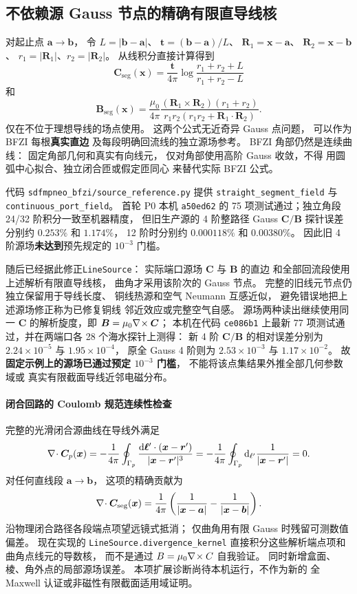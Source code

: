 \subsection{不依赖源 Gauss 节点的精确有限直导线核}
对起止点 $\bm a\to\bm b$，
令 $L=|\bm b-\bm a|$、
$\bm t=(\bm b-\bm a)/L$、
$\bm R_1=\bm x-\bm a$、
$\bm R_2=\bm x-\bm b$、
$r_1=|\bm R_1|$、$r_2=|\bm R_2|$。
从线积分直接计算得到
\[
\boxed{
\bm C_{\mathrm{seg}}(\bm x)
=\frac{\bm t}{4\pi}
\log\frac{r_1+r_2+L}{r_1+r_2-L}
}
\]
和
\[
\boxed{
\bm B_{\mathrm{seg}}(\bm x)
=\frac{\mu_0}{4\pi}
\frac{(\bm R_1\times\bm R_2)(r_1+r_2)}
{r_1r_2(r_1r_2+\bm R_1\cdot\bm R_2)} .
}
\]
仅在不位于理想导线的场点使用。
这两个公式无近奇异 Gauss 点问题，
可以作为 BFZI 每根\textbf{真实直边}
及每段明确回流线的独立源场参考。
BFZI 角部仍然是连续曲线：
固定角部几何和真实有向线元，
仅对角部使用高阶 Gauss 收敛，不得
用圆弧中心拟合、独立闭合匝或假定匝同心
来替代实际 BFZI 公式。

代码 \texttt{sdfmpneo\_bfzi/source\_reference.py}
提供 \texttt{straight\_segment\_field} 与
\texttt{continuous\_port\_field}。
首轮 P0 本机 \texttt{a50ed62} 的
75 项测试通过；独立角段 24/32 阶积分一致至机器精度，
但旧生产源的 4 阶整路径 Gauss
$\bm C/\bm B$ 探针误差分别约
$0.253\%$ 和 $1.174\%$，
12 阶时分别约 $0.000118\%$ 和 $0.00380\%$。
因此旧 4 阶源场\textbf{未达到}预先规定的
$10^{-3}$ 门槛。

随后已经据此修正\texttt{LineSource}：
实际端口源场 $\bm C$ 与 $\bm B$ 的直边
和全部回流段使用上述解析有限直导线核，
曲角才采用该阶次的 Gauss 节点。
完整的旧线元节点仍独立保留用于导线长度、
铜线热源和空气 Neumann 互感近似，
避免错误地把上述源场修正称为已修复铜线
邻近效应或完整空气自感。
源场两种读出继续使用同一
$\bm C$ 的解析旋度，即
$\bm B=\mu_0\nabla\!\times\bm C$；
本机在代码 \texttt{ce086b1} 上最新
77 项测试通过，并在两端口各 28 个海水探针上测得：
新 4 阶 $\bm C/\bm B$ 的相对误差分别为
$2.24\times10^{-5}$ 与 $1.95\times10^{-4}$，
原全 Gauss 4 阶则为
$2.53\times10^{-3}$ 与 $1.17\times10^{-2}$。
故\textbf{固定示例上的源场已通过预定 $10^{-3}$ 门槛}，
不能将该点集结果外推全部几何参数域或
真实有限截面导线近邻电磁分布。

\paragraph{闭合回路的 Coulomb 规范连续性检查}
完整的光滑闭合源曲线在导线外满足
\[
\nabla\!\cdot\bm C_p(\bm x)
=-\frac1{4\pi}\oint_{\Gamma_p}
\frac{\mathrm d\bm\ell'\cdot(\bm x-\bm r')}
{|\bm x-\bm r'|^3}
=-\frac1{4\pi}\oint_{\Gamma_p}
\mathrm d_{\ell'}\frac1{|\bm x-\bm r'|}
=0.
\]
对任何直线段 $\bm a\to\bm b$，
这项的精确贡献为
\[
\nabla\!\cdot\bm C_{\rm seg}(\bm x)=
\frac1{4\pi}\left(
\frac1{|\bm x-\bm a|}
-\frac1{|\bm x-\bm b|}\right).
\]
沿物理闭合路径各段端点项望远镜式抵消；
仅曲角用有限 Gauss 时残留可测数值偏差。
现在实现的
\texttt{LineSource.divergence\_kernel}
直接积分这些解析端点项和曲角点线元的导数核，
而不是通过 $B=\mu_0\nabla\!\times C$ 自我验证。
同时新增盒面、棱、角外点的局部源场误差。
本项扩展诊断尚待本机运行，不作为新的
全 Maxwell 认证或非磁性有限截面适用域证明。


